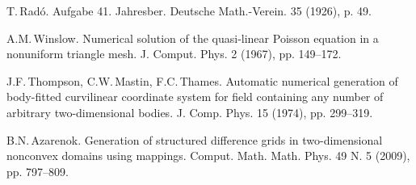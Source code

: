 
\begin{thebibliography}{10}
{\sc T.\,Rad\'o}. {Aufgabe 41}. Jahresber. Deutsche Math.-Verein. 35 (1926), p. 49.

{\sc A.M.\,Winslow}. {Numerical solution of the quasi-linear Poisson equation in a nonuniform triangle mesh}. J. Comput. Phys. 2 (1967), pp. 149--172.

{\sc J.F.\,Thompson, C.W.\,Mastin, F.C.\,Thames}. {Automatic numerical generation of body-fitted curvilinear coordinate system for field containing any
number of arbitrary two-dimensional bodies}. J. Comp. Phys. 15 (1974), pp. 299--319.

{\sc B.N.\,Azarenok}. {Generation of structured difference grids in two-dimensional nonconvex domains using mappings}. Comput. Math. Math. Phys. 49 N. 5 (2009), pp. 797--809.

\end{thebibliography}
